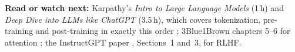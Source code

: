 \textbf{Read or watch next:} Karpathy's \emph{Intro to Large Language Models} (1\,h) and
\emph{Deep Dive into LLMs like ChatGPT} (3.5\,h), which covers tokenization, pre-training
and post-training in exactly this order ; 3Blue1Brown
chapters 5--6 for attention ; the InstructGPT paper ,
Sections~1 and~3, for RLHF.
